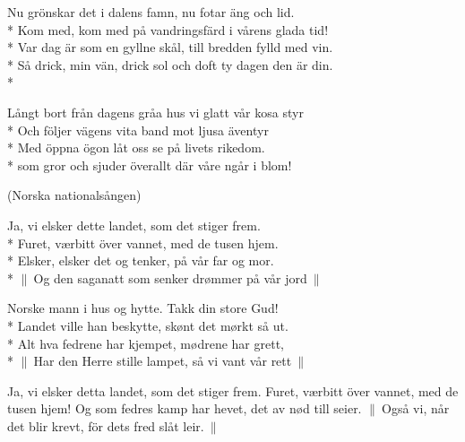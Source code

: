 \begin{SongText}
    \begin{SongVerse}
        Nu grönskar det i dalens famn, nu fotar äng och lid.\\*%
        Kom med, kom med på vandringsfärd i vårens glada tid!\\*%
        Var dag är som en gyllne skål, till bredden fylld med vin.\\*%
        Så drick, min vän, drick sol och doft ty dagen den är din.\\*%
    \end{SongVerse}
    \begin{SongVerse}
        Långt bort från dagens gråa hus vi glatt vår kosa styr\\*%
        Och följer vägens vita band mot ljusa äventyr\\*%
        Med öppna ögon låt oss se på livets rikedom.\\*%
        som gror och sjuder överallt där våre ngår i blom!
    \end{SongVerse}
\end{SongText}
\begin{SongText}[Ja vi elsker]
    \begin{SongInfo}
        (Norska nationalsången)
    \end{SongInfo}
    \begin{SongVerse}
        Ja, vi elsker dette landet, som det stiger frem.\\*%
        Furet, værbitt över vannet, med de tusen hjem.\\*%
        Elsker, elsker det og tenker, på vår far og mor.\\*%
        $\|\:$Og den saganatt som senker drømmer på vår jord$\:\|$
    \end{SongVerse}
    \begin{SongVerse}
        Norske mann i hus og hytte. Takk din store Gud!\\*%
        Landet ville han beskytte, skønt det mørkt så ut.\\*%
        Alt hva fedrene har kjempet, mødrene har grett,\\*%
        $\|\:$Har den Herre stille lampet, så vi vant vår rett$\:\|$
    \end{SongVerse}
    \begin{SongVerse}
        Ja, vi elsker detta landet, som det stiger frem.
        Furet, værbitt över vannet, med de tusen hjem!
        Og som fedres kamp har hevet, det av nød till seier.
        $\|\:$Også vi, når det blir krevt, för dets fred slåt leir.$\:\|$
    \end{SongVerse}
\end{SongText}
